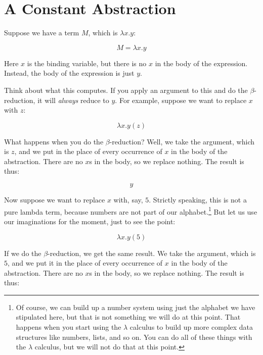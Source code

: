 \documentclass{book}
\numberwithin{equation}{chapter}
\begin{document}
\section{A Constant Abstraction}

Suppose we have a term $M$, which is $\lambda x.y$:

\begin{equation}
M = \lambda x.y
\end{equation}

\noindent
Here $x$ is the binding variable, but there is no $x$ in the body of the expression. Instead, the body of the expression is just $y$.

Think about what this computes. If you apply an argument to this and do the $\beta$-reduction, it will \textit{always} reduce to $y$. For example, suppose we want to replace $x$ with $z$:

\begin{equation}
\lambda x.y (z)
\end{equation}

\noindent
What happens when you do the $\beta$-reduction? Well, we take the argument, which is $z$, and we put in the place of every occurrence of $x$ in the body of the abstraction. There are no $x$s in the body, so we replace nothing. The result is thus: 

\begin{equation}
y
\end{equation}

\noindent
Now suppose we want to replace $x$ with, say, $5$. Strictly speaking, this is not a pure lambda term, because numbers are not part of our alphabet.\footnote{Of course, we can build up a number system using just the alphabet we have stipulated here, but that is not something we will do at this point. That happens when you start using the $\lambda$ calculus to build up more complex data structures like numbers, lists, and so on. You can do all of these things with the $\lambda$ calculus, but we will not do that at this point.} But let us use our imaginations for the moment, just to see the point:

\begin{equation}
\lambda x.y (5)
\end{equation}

\noindent
If we do the $\beta$-reduction, we get the same result. We take the argument, which is $5$, and we put it in the place of every occurrence of $x$ in the body of the abstraction. There are no $x$s in the body, so we replace nothing. The result is thus:
\end{document}
